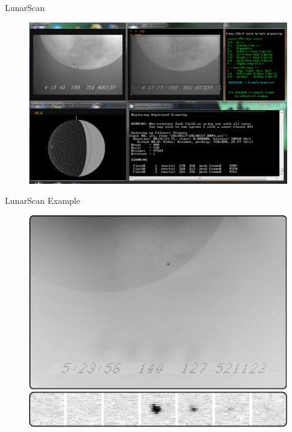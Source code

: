 \documentclass[pdf]{beamer}
\begin{document}
\begin{frame}{LunarScan}
  \begin{figure}[ht!]
	\centering
	\includegraphics[width=\textwidth]{Images/LunarScan_screenshot.png}
  \end{figure}
\end{frame}

\begin{frame}{LunarScan Example}
  \begin{figure}[h!]
	\centering
	\includegraphics[width=.75\textwidth]{Images/lunarscan_example.pdf}
  \end{figure}
\end{frame}
\end{document}
